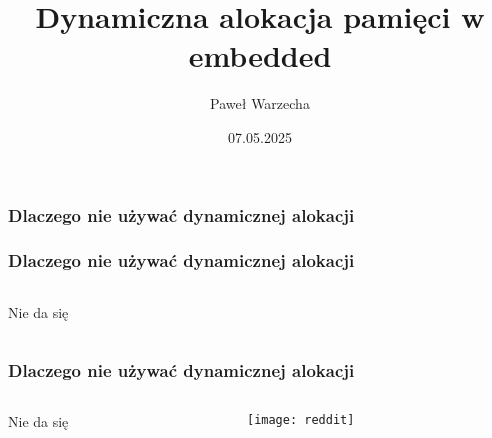 \documentclass{beamer}
\title{Dynamiczna alokacja pamięci w embedded}
\author{Paweł Warzecha}
\institute{Wro.cpp}
\date{07.05.2025}
\makeatletter
\newenvironment{myitemize}{%
   \setlength{\topsep}{0pt}
   \setlength{\partopsep}{0pt}
   \renewcommand*{\@listi}{\leftmargin\leftmargini \parsep\z@ \topsep\z@ \itemsep\z@}
   \let\@listI\@listi
   \itemize
}{\enditemize}
\makeatother
\begin{document}
\frame{\titlepage}
\begin{frame}[t]
    \frametitle{Dlaczego nie używać dynamicznej alokacji}
\end{frame}
\begin{frame}[t]
    \frametitle{Dlaczego nie używać dynamicznej alokacji}
    \begin{columns}[t]
        \begin{column}[t]{0.35\textwidth}
            \begin{myitemize}
                \item Nie da się
            \end{myitemize}
        \end{column}
        \begin{column}[t]{0.7\textwidth}
        \end{column}
    \end{columns}
\end{frame}
\begin{frame}[t]
    \frametitle{Dlaczego nie używać dynamicznej alokacji}
    \begin{columns}[t]
        \begin{column}[t]{0.35\textwidth}
            \begin{myitemize}
                \item Nie da się
            \end{myitemize}
        \end{column}
        \begin{column}[t]{0.7\textwidth}
            \begin{center}
            \texttt{[image: reddit]}\\
            \tiny \cite{reddit} 
            \end{center}
        \end{column}
    \end{columns}
\end{frame}
\end{document}
